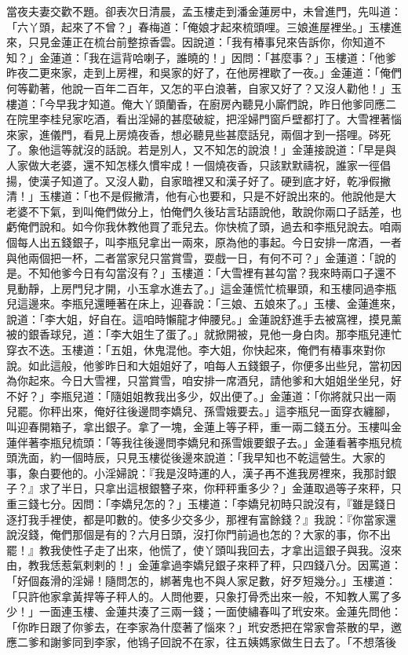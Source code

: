 當夜夫妻交歡不題。卻表次日清晨，孟玉樓走到潘金蓮房中，未曾進門，先叫道：「六丫頭，起來了不曾？」春梅道：「俺娘才起來梳頭哩。三娘進屋裡坐。」玉樓進來，只見金蓮正在梳台前整掠香雲。因說道：「我有椿事兒來告訴你，你知道不知？」金蓮道：「我在這背哈喇子，誰曉的！」因問：「甚麼事？」玉樓道：「他爹昨夜二更來家，走到上房裡，和吳家的好了，在他房裡歇了一夜。」金蓮道：「俺們何等勸著，他說一百年二百年，又怎的平白浪著，自家又好了？又沒人勸他！」玉樓道：「今早我才知道。俺大丫頭蘭香，在廚房內聽見小廝們說，昨日他爹同應二在院里李桂兒家吃酒，看出淫婦的甚麼破綻，把淫婦門窗戶壁都打了。大雪裡著惱來家，進儀門，看見上房燒夜香，想必聽見些甚麼話兒，兩個才到一搭哩。硶死了。象他這等就沒的話說。若是別人，又不知怎的說浪！」金蓮接說道：「早是與人家做大老婆，還不知怎樣久慣牢成！一個燒夜香，只該默默禱祝，誰家一徑倡揚，使漢子知道了。又沒人勸，自家暗裡又和漢子好了。硬到底才好，乾凈假撇清！」玉樓道：「也不是假撇清，他有心也要和，只是不好說出來的。他說他是大老婆不下氣，到叫俺們做分上，怕俺們久後玷言玷語說他，敢說你兩口子話差，也虧俺們說和。如今你我休教他買了乖兒去。你快梳了頭，過去和李瓶兒說去。咱兩個每人出五錢銀子，叫李瓶兒拿出一兩來，原為他的事起。今日安排一席酒，一者與他兩個把一杯，二者當家兒只當賞雪，耍戲一日，有何不可？」金蓮道：「說的是。不知他爹今日有勾當沒有？」玉樓道：「大雪裡有甚勾當？我來時兩口子還不見動靜，上房門兒才開，小玉拿水進去了。」這金蓮慌忙梳畢頭，和玉樓同過李瓶兒這邊來。李瓶兒還睡著在床上，迎春說：「三娘、五娘來了。」玉樓、金蓮進來，說道：「李大姐，好自在。這咱時懶龍才伸腰兒。」金蓮說舒進手去被窩裡，摸見薰被的銀香球兒，道：「李大姐生了蛋了。」就掀開被，見他一身白肉。那李瓶兒連忙穿衣不迭。玉樓道：「五姐，休鬼混他。李大姐，你快起來，俺們有椿事來對你說。如此這般，他爹昨日和大姐姐好了，咱每人五錢銀子，你便多出些兒，當初因為你起來。今日大雪裡，只當賞雪，咱安排一席酒兒，請他爹和大姐姐坐坐兒，好不好？」李瓶兒道：「隨姐姐教我出多少，奴出便了。」金蓮道：「你將就只出一兩兒罷。你秤出來，俺好往後邊問李嬌兒、孫雪娥要去。」這李瓶兒一面穿衣纏腳，叫迎春開箱子，拿出銀子。拿了一塊，金蓮上等子秤，重一兩二錢五分。玉樓叫金蓮伴著李瓶兒梳頭：「等我往後邊問李嬌兒和孫雪娥要銀子去。」金蓮看著李瓶兒梳頭洗面，約一個時辰，只見玉樓從後邊來說道：「我早知也不乾這營生。大家的事，象白要他的。小淫婦說：『我是沒時運的人，漢子再不進我房裡來，我那討銀子？』求了半日，只拿出這根銀簪子來，你秤秤重多少？」金蓮取過等子來秤，只重三錢七分。因問：「李嬌兒怎的？」玉樓道：「李嬌兒初時只說沒有，『雖是錢日逐打我手裡使，都是叩數的。使多少交多少，那裡有富餘錢？』我說：『你當家還說沒錢，俺們那個是有的？六月日頭，沒打你門前過也怎的？大家的事，你不出罷！』教我使性子走了出來，他慌了，使丫頭叫我回去，才拿出這銀子與我。沒來由，教我恁惹氣剌剌的！」金蓮拿過李嬌兒銀子來秤了秤，只四錢八分。因罵道：「好個姦滑的淫婦！隨問怎的，綁著鬼也不與人家足數，好歹短幾分。」玉樓道：「只許他家拿黃捍等子秤人的。人問他要，只象打骨禿出來一般，不知教人罵了多少！」一面連玉樓、金蓮共湊了三兩一錢；一面使繡春叫了玳安來。金蓮先問他：「你昨日跟了你爹去，在李家為什麼著了惱來？」玳安悉把在常家會茶散的早，邀應二爹和謝爹同到李家，他鴇子回說不在家，往五姨媽家做生日去了。「不想落後